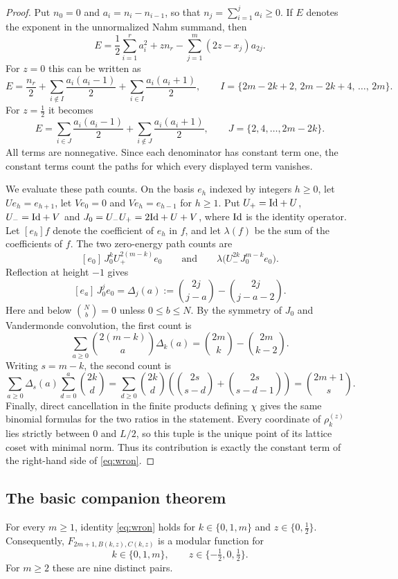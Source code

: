 \begin{proof}
Put $n_0=0$ and $a_i=n_i-n_{i-1}$, so that $n_j=\sum_{i=1}^ja_i\ge0$. If $E$ denotes the exponent in the unnormalized Nahm summand, then
\[
E=\frac12\sum_{i=1}^ra_i^2+zn_r-\sum_{j=1}^m(2z-x_j)a_{2j}.
\]
For $z=0$ this can be written as
\[
E=\frac{n_r}2+\sum_{i\notin I}\frac{a_i(a_i-1)}2+\sum_{i\in I}\frac{a_i(a_i+1)}2,\qquad I=\{2m-2k+2,\,2m-2k+4,\,\dots,\,2m\}.
\]
For $z=\frac12$ it becomes
\[
E=\sum_{i\in J}\frac{a_i(a_i-1)}2+\sum_{i\notin J}\frac{a_i(a_i+1)}2,\qquad J=\{2,4,\dots,2m-2k\}.
\]
All terms are nonnegative. Since each denominator has constant term one, the constant terms count the paths for which every displayed term vanishes.

We evaluate these path counts. On the basis $e_h$ indexed by integers $h\ge0$, let $Ue_h=e_{h+1}$, let $Ve_0=0$ and $Ve_h=e_{h-1}$ for $h\ge1$. Put $U_+=\mathrm{Id}+U$, $U_-=\mathrm{Id}+V$ and $J_0=U_-U_+=2\mathrm{Id}+U+V$, where $\mathrm{Id}$ is the identity operator. Let $[e_h]f$ denote the coefficient of $e_h$ in $f$, and let $\lambda(f)$ be the sum of the coefficients of $f$. The two zero-energy path counts are
\[
[e_0]\,J_0^kU_+^{2(m-k)}e_0\qquad\text{and}\qquad \lambda\bigl(U_-^{2k}J_0^{m-k}e_0\bigr).
\]
Reflection at height $-1$ gives
\[
[e_a]\,J_0^je_0=\Delta_j(a):=\binom{2j}{j-a}-\binom{2j}{j-a-2}.
\]
Here and below $\binom Nb=0$ unless $0\le b\le N$. By the symmetry of $J_0$ and Vandermonde convolution, the first count is
\[
\sum_{a\ge0}\binom{2(m-k)}a\Delta_k(a)=\binom{2m}k-\binom{2m}{k-2}.
\]
Writing $s=m-k$, the second count is
\[
\sum_{a\ge0}\Delta_s(a)\sum_{d=0}^a\binom{2k}d=\sum_{d\ge0}\binom{2k}d\left(\binom{2s}{s-d}+\binom{2s}{s-d-1}\right)=\binom{2m+1}s.
\]
Finally, direct cancellation in the finite products defining $\chi$ gives the same binomial formulas for the two ratios in the statement. Every coordinate of $\rho^{(z)}_k$ lies strictly between $0$ and $L/2$, so this tuple is the unique point of its lattice coset with minimal norm. Thus its contribution is exactly the constant term of the right-hand side of \eqref{eq:wron}.
\end{proof}

\subsection{The basic companion theorem}

\begin{theorem}\label{thm:basic}
For every $m\ge1$, identity \eqref{eq:wron} holds for $k\in\{0,1,m\}$ and $z\in\{0,\frac12\}$. Consequently, $F_{2m+1,B(k,z),C(k,z)}$ is a modular function for
\[
k\in\{0,1,m\},\qquad z\in\{-\tfrac12,0,\tfrac12\}.
\]
For $m\ge2$ these are nine distinct pairs.
\end{theorem}

